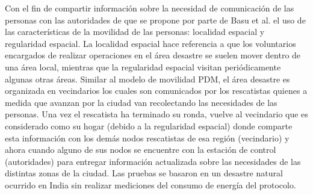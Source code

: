 Con el fin de compartir información sobre la necesidad de comunicación de las
personas con las autoridades de que se propone por parte de Basu et al.
\cite{Basu2016} el uso de las características de la movilidad de las personas:
localidad espacial y regularidad espacial. La localidad espacial hace referencia
a que los voluntarios encargados de realizar operaciones en el área desastre se
suelen mover dentro de una  área local, mientras que la regularidad espacial
visitan periódicamente algunas otras áreas. Similar al modelo de movilidad PDM,
el área desastre es organizada en vecindarios los cuales son comunicados por los
rescatistas quienes a medida que avanzan por la ciudad van recolectando las
necesidades de las personas. Una vez el rescatista ha terminado su ronda, vuelve al
vecindario que es considerado como su hogar (debido a la regularidad espacial)
donde comparte esta información con los demás nodos rescatistas de esa
región (vecindario) y ahora cuando alguno de sus nodos se encuentre con la
estación de control (autoridades) para entregar información actualizada sobre
las necesidades de las distintas zonas de la ciudad. Las pruebas se basaron en
un desastre natural ocurrido en India sin realizar mediciones del consumo de
energía del protocolo.

